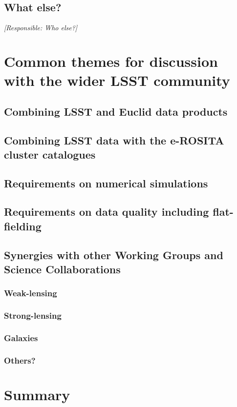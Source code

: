 \documentclass[a4paper,11pt]{article}
\begin{document}
\subsection{What else?}

{\it [Responsible: Who else?]}

\section{Common themes for discussion with the wider LSST community}

\subsection{Combining LSST and Euclid data products}

\subsection{Combining LSST data with the e-ROSITA cluster catalogues}

\subsection{Requirements on numerical simulations}

\subsection{Requirements on data quality including flat-fielding}

\subsection{Synergies with other Working Groups and Science Collaborations}

\subsubsection{Weak-lensing}

\subsubsection{Strong-lensing}

\subsubsection{Galaxies}

\subsubsection{Others?}

\section{Summary}
\end{document}
